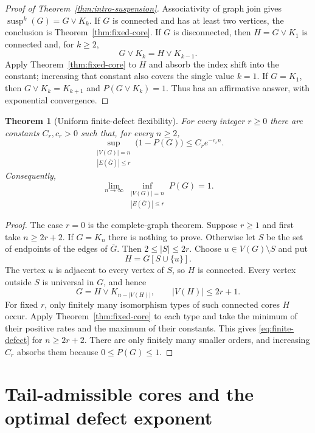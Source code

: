 \documentclass[11pt,reqno]{amsart}
\newtheorem{theorem}{Theorem}[section]
\theoremstyle{definition}
\theoremstyle{remark}
\newcommand{\susp}{\operatorname{susp}}
\begin{document}
\begin{proof}[Proof of Theorem~\ref{thm:intro-suspension}]
Associativity of graph join gives $\susp^k(G)=G\vee K_k$.  If $G$ is
connected and has at least two vertices, the conclusion is
Theorem~\ref{thm:fixed-core}.  If $G$ is disconnected, then
$H=G\vee K_1$ is connected and, for $k\ge2$,
\[
  G\vee K_k=H\vee K_{k-1}.
\]
Apply Theorem~\ref{thm:fixed-core} to $H$ and absorb the index shift into the
constant; increasing that constant also covers the single value $k=1$.
If $G=K_1$, then $G\vee K_k=K_{k+1}$ and $P(G\vee K_k)=1$.
Thus \cite[Question~5]{EJT2026} has an affirmative answer, with exponential
convergence.
\end{proof}

\begin{theorem}[Uniform finite-defect flexibility]\label{thm:finite-defect}
For every integer $r\ge0$ there are constants $C_r,c_r>0$ such that, for
every $n\ge2$,
\begin{equation}\label{eq:finite-defect}
  \sup_{\substack{|V(G)|=n\\ |E(\overline G)|\le r}}
  \bigl(1-P(G)\bigr)
  \le C_re^{-c_rn}.
\end{equation}
Consequently,
\[
  \lim_{n\to\infty}
  \inf_{\substack{|V(G)|=n\\ |E(\overline G)|\le r}}P(G)=1.
\]
\end{theorem}

\begin{proof}
The case $r=0$ is the complete-graph theorem.  Suppose $r\ge1$ and first
take $n\ge2r+2$.  If $G=K_n$ there is nothing to prove.  Otherwise let $S$
be the set of endpoints of the edges of $\overline G$.  Then
$2\le |S|\le2r$.  Choose $u\in V(G)\setminus S$ and put
\[
  H=G[S\cup\{u\}].
\]
The vertex $u$ is adjacent to every vertex of $S$, so $H$ is connected.
Every vertex outside $S$ is universal in $G$, and hence
\[
  G=H\vee K_{n-|V(H)|},
  \qquad |V(H)|\le2r+1.
\]
For fixed $r$, only finitely many isomorphism types of such connected cores
$H$ occur.  Apply Theorem~\ref{thm:fixed-core} to each type and take the
minimum of their positive rates and the maximum of their constants.  This
gives \eqref{eq:finite-defect} for $n\ge2r+2$.  There are only finitely many
smaller orders, and increasing $C_r$ absorbs them because $0\le P(G)\le1$.
\end{proof}

\section{Tail-admissible cores and the optimal defect exponent}
\label{sec:tail-admissible}
\end{document}
